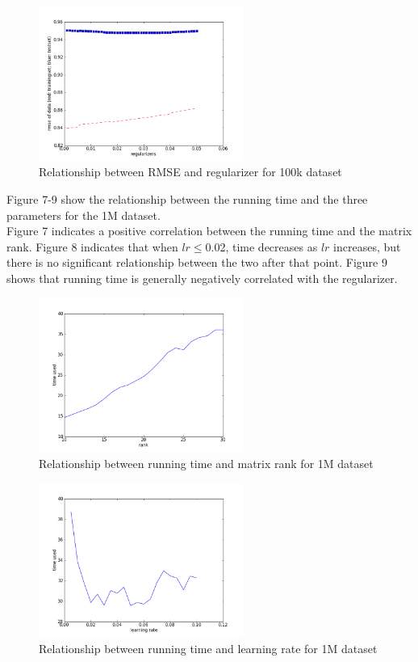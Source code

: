 \documentclass[12pt]{article}
\begin{document}
\begin{figure}[H]
\centering
\includegraphics[width=0.60\textwidth]{graphs/smallrmsereg.png}
\caption{Relationship between RMSE and regularizer for 100k dataset}
\end{figure}

\noindent Figure 7-9 show the relationship between the running time and the three parameters
for the 1M dataset.\\

\noindent Figure 7 indicates a positive correlation between the running time
and the matrix rank. Figure 8 indicates that when $lr\leq$0.02, time decreases
as $lr$ increases, but there is no significant relationship between the two after that point.
Figure 9 shows that running time is generally negatively correlated with the regularizer.

\begin{figure}[H]
\centering
\includegraphics[width=0.60\textwidth]{graphs/bigtimerank.png}
\caption{Relationship between running time and matrix rank for 1M dataset}
\end{figure}

\begin{figure}[H]
\centering
\includegraphics[width=0.60\textwidth]{graphs/bigtimelr.png}
\caption{Relationship between running time and learning rate for 1M dataset}
\end{figure}
\end{document}
